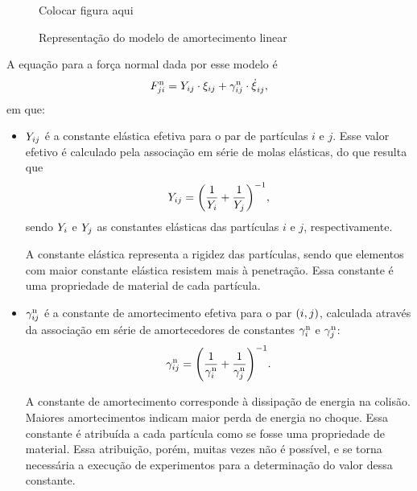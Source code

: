 \begin{figure}[h]
	\caption{Representação do modelo de amortecimento linear}
	\centering
		\alert{Colocar figura aqui}
	\label{fig:linear_dashpot_force}
\end{figure}

A equação para a força normal dada por esse modelo é
\begin{equation} \label{eq:linear_dashpot_force}
	\normalForceScalarji = \elasticModulusij\cdot\overlapij + \normalDampingConstantij\cdot\overlapDerivativeij,
\end{equation}
em que:
\begin{itemize}
	\item \({Y}_{i j}\) é a constante elástica efetiva para o par de partículas \(i\) e \(j\). Esse valor efetivo é calculado pela associação em série de molas elásticas, do que resulta que
	\begin{equation*}
		\elasticModulusij = \pqty{\dfrac{1}{\elasticModulusi} + \dfrac{1}{\elasticModulusj}}^{-1},
	\end{equation*}
	sendo \({Y}_{i}\) e \({Y}_{j}\) as constantes elásticas das partículas \(i\) e \(j\), respectivamente.

	A constante elástica representa a rigidez das partículas, sendo que elementos com maior constante elástica resistem mais à penetração. Essa constante é uma propriedade de material de cada partícula.

	\item \({\gamma}_{i j}^{\text{n}}\) é a constante de amortecimento efetiva para o par \(\pqty{i, j}\), calculada através da associação em série de amortecedores de constantes \({\gamma}_{i}^{\text{n}}\) e \({\gamma}_{j}^{\text{n}}\):
	\begin{equation*}
		\normalDampingConstantij = \pqty{\dfrac{1}{\normalDampingConstanti} + \dfrac{1}{\normalDampingConstantj}}^{-1}.
	\end{equation*}

	A constante de amortecimento corresponde à dissipação de energia na colisão. Maiores amortecimentos indicam maior perda de energia no choque. Essa constante é atribuída a cada partícula como se fosse uma propriedade de material. Essa atribuição, porém, muitas vezes não é possível, e se torna necessária a execução de experimentos para a determinação do valor dessa constante.
\end{itemize}

